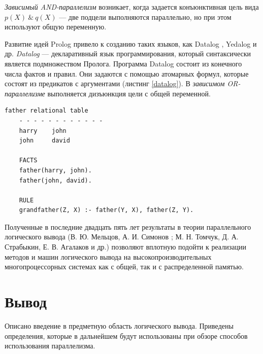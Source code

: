 \textit{Зависимый AND-параллелизм} возникает, когда задается конъюнктивная цель вида $p (X)\ \&\ q (X)$ --- две подцели выполняются параллельно, но при этом используют общую переменную.

Развитие идей Prolog привело к созданию таких языков, как Datalog \cite{datalog}, Yedalog \cite{yedalog} и др. 
\textit{Datalog} --- декларативный язык программирования, который синтаксически является подмножеством Пролога. Программа Datalog состоит из конечного числа фактов и правил. Они задаются с помощью атомарных формул, которые состоят из предикатов с аргументами (листинг \ref{datalog}). В \textit{зависимом OR-параллелизме} выполняется дизъюнкция цели с общей переменной. 
\newpage
\begin{lstlisting}[label = datalog, caption=Пример описания отношений с использованием Datalog, numbers = none]
	father relational table
	- - - - - - - - - - - -
	harry    john
	john     david

	FACTS
	father(harry, john).
	father(john, david).
	
	RULE
	grandfather(Z, X) :- father(Y, X), father(Z, Y).
\end{lstlisting}

Полученные в последние двадцать пять лет результаты в теории параллельного логического вывода (В. Ю. Мельцов, А. И. Симонов \cite{logic_researchers_3}; М. Н. Томчук, Д. А. Страбыкин, Е. В. Агалаков \cite{logic_researchers_4} и др.) позволяют вплотную подойти к реализации методов и машин логического вывода на высокопроизводительных многопроцессорных системах как с общей, так и с распределенной памятью. 

\section{Вывод}
Описано введение в предметную область логического вывода. Приведены определения, которые в дальнейшем будут использованы при обзоре способов использования параллелизма. 